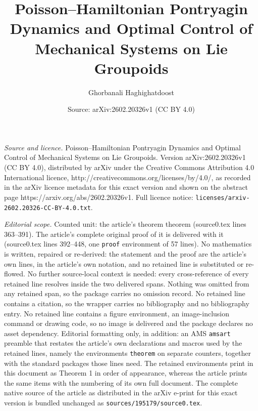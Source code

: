 \documentclass[10pt,a4paper]{amsart}
\title{Poisson–Hamiltonian Pontryagin Dynamics and Optimal Control of Mechanical Systems on Lie Groupoids}
\author{Ghorbanali Haghighatdoost}
\date{Source: arXiv:2602.20326v1 (CC BY 4.0)}
\begin{document}
\maketitle

\noindent\emph{Source and licence.} Poisson–Hamiltonian Pontryagin Dynamics and Optimal Control of Mechanical Systems on Lie Groupoids. Version arXiv:2602.20326v1 (CC BY 4.0), distributed by arXiv under the Creative Commons Attribution 4.0 International licence, http://creativecommons.org/licenses/by/4.0/, as recorded in the arXiv licence metadata for this exact version and shown on the abstract page https://arxiv.org/abs/2602.20326v1. Full licence notice: \texttt{licenses/arxiv-2602.20326-CC-BY-4.0.txt}.\par\smallskip

\noindent\textit{Editorial scope.} Counted unit: the article's theorem theorem (source0.tex lines 363--391). The article's complete original proof of it is delivered with it (source0.tex lines 392--448, one \texttt{proof} environment of 57 lines). No mathematics is written, repaired or re-derived: the statement and the proof are the article's own lines, in the article's own notation, and no retained line is substituted or re-flowed.  No further source-local context is needed: every cross-reference of every retained line resolves inside the two delivered spans.  Nothing was omitted from any retained span, so the package carries no omission record.  No retained line contains a citation, so the wrapper carries no bibliography and no bibliography entry.  No retained line contains a figure environment, an image-inclusion command or drawing code, so no image is delivered and the package declares no asset dependency.  Editorial formatting only, in addition: an AMS \texttt{amsart} preamble that restates the article's own declarations and macros used by the retained lines, namely the environments \texttt{theorem} on separate counters, together with the standard packages those lines need.  The retained environments print in this document as Theorem 1 in order of appearance, whereas the article prints the same items with the numbering of its own full document.  The complete native source of the article as distributed in the arXiv e-print for this exact version is bundled unchanged as \texttt{sources/195179/source0.tex}.
\end{document}
